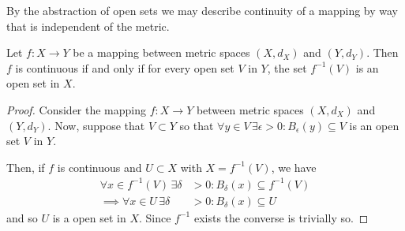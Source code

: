 By the abstraction of open sets we may describe continuity of a mapping by
way that is independent of the metric.

\begin{thm}
	Let $f:X \to Y$ be a mapping between metric spaces $(X,d_{X})$ and
	$(Y,d_{Y})$. Then $f$ is continuous if and only if for every open
	set $V$ in $Y$, the set $f^{-1}(V)$ is an open set in $X$.
\end{thm}

\begin{proof}
	Consider the mapping $f:X \to Y$ between metric spaces $(X,d_{X})$
	and $(Y,d_{Y})$. Now, suppose that $V \subset Y$ so that
	$\forall y \in V \, \exists \epsilon >0 : B_{\epsilon}(y) \subseteq V$
	is an open set $V$ in $Y$.
	
	Then, if $f$ is continuous and $U \subset X$ with $X=f^{-1}(V)$, we have
	\begin{align*}
		\forall x \in f^{-1}(V) \, \exists \delta & >0 : B_{\delta}(x) \subseteq f^{-1}(V)
		\\ \implies
		\forall x \in U \, \exists \delta & >0 : B_{\delta}(x) \subseteq U
	\end{align*}
	and so $U$ is a open set in $X$. Since $f^{-1}$ exists the converse is trivially so.
\end{proof}
